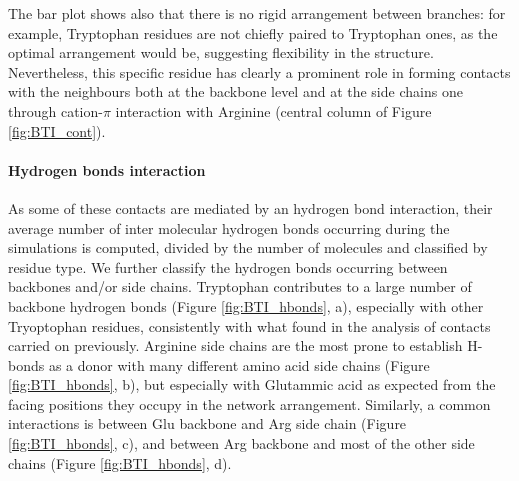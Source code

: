 The bar plot shows also that there is no rigid arrangement between branches: for example, Tryptophan residues are not chiefly paired to Tryptophan ones, as the optimal arrangement would be, suggesting flexibility in the structure.
%
Nevertheless, this specific residue has clearly a prominent role in forming contacts with the neighbours both at the backbone level and at the side chains one through cation-$\pi$ interaction with Arginine (central column of Figure \ref{fig:BTI_cont}).

\paragraph{Hydrogen bonds interaction} As some of these contacts are mediated by an hydrogen bond interaction, their average number of inter molecular hydrogen bonds occurring during the simulations is computed, divided by the number of molecules and classified by residue type.
We further classify the hydrogen bonds occurring between backbones and/or side chains. Tryptophan contributes to a large number of backbone hydrogen bonds (Figure \ref{fig:BTI_hbonds}, a), especially with other Tryoptophan residues, consistently with what found in the analysis of contacts carried on previously. Arginine side chains are the most prone to establish H-bonds as a donor with many different amino acid side chains (Figure \ref{fig:BTI_hbonds}, b), but especially with Glutammic acid as expected from the facing positions they occupy in the network arrangement.
%
Similarly, a common interactions is between Glu backbone and Arg side chain (Figure \ref{fig:BTI_hbonds}, c), and between Arg backbone and most of the other side chains (Figure \ref{fig:BTI_hbonds}, d).
